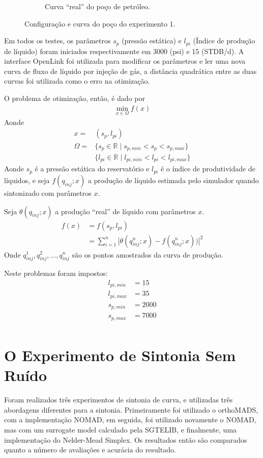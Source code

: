 \begin{figure}[H]
\begin{subfigure}{.75\textwidth}
  \caption{Curva ``real'' do poço de petróleo.}
  \label{fig:truth1}
\end{subfigure}
\caption{Configuração e curva do poço do experimento 1.}
\label{fig:setup1}
\end{figure}

Em todos os testes, os parâmetros $s_p$ (pressão estática) e $l_{pi}$ (Índice de produção de líquido) foram iniciados respectivamente em 3000 (psi) e 15 (STDB/d). A interface OpenLink foi utilizada para modificar os parâmetros e ler uma nova curva de fluxo de líquido por injeção de gás, a distância quadrática entre as duas curvas foi utilizada como o erro na otimização.

O problema de otimização, então, é dado por 
\begin{align}
\min\limits_{x \in \Omega} f(x)
\end{align}
Aonde
\begin{align}
x = &(s_p, l_{pi})\\
\Omega = &\{s_p \in \mathbb{R} \mid s_{p,min} < s_p < s_{p,max}\}\\
          &\{l_{pi} \in \mathbb{R} \mid  l_{pi,min} < l_{pi} < l_{pi,max}\}
\end{align}
Aonde $s_p$ é a pressão estática do reservatório e $l_{pi}$ é o índice de produtividade de líquidos, e seja $f(q_{inj};x)$ a produção de líquido estimada pelo simulador quando sintonizado com parâmetros $x$. 

Seja $\theta(q_{inj};x)$ a produção ``real'' de líquido com parâmetros $x$.
\begin{align}
f(x) &= f(s_p, l_{pi}) \\
     &= \sum_{i=1}^n \Big[ \theta(q_{inj}^n;x) - f(q_{inj}^n;x))\Big]^2
\end{align}
Onde $q_{inj}^1, q_{inj}^2, \dots, q_{inj}^n$ são os pontos amostrados da curva de produção. 

Neste problemas foram impostos: 
\begin{align*}
l_{pi,min}&= 15\\
l_{pi,max}&= 35\\
s_{p,min} &= 2000\\
s_{p,max} &= 7000\\
\end{align*}
\chapter{O Experimento de Sintonia Sem Ruído}

Foram realizados três experimentos de sintonia de curva, e utilizadas três abordagens diferentes para a sintonia. Primeiramente foi utilizado o orthoMADS, com a implementação NOMAD, em seguida, foi utilizado novamente o NOMAD, mas com um surrogate model calculado pela SGTELIB, e finalmente, uma implementação do Nelder-Mead Simplex. Os resultados então são comparados quanto a número de avaliações e acurácia do resultado.

